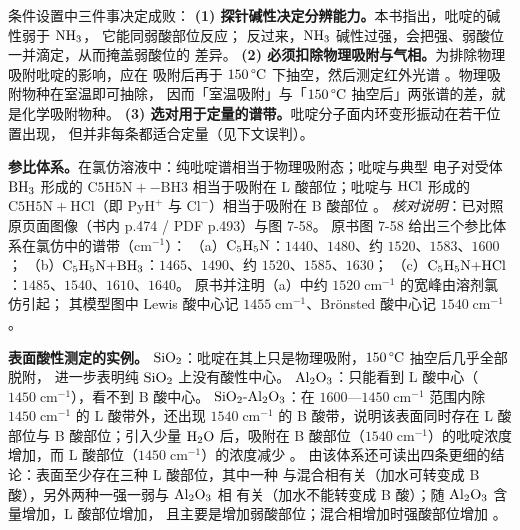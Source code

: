 \begin{measure}
条件设置中三件事决定成败：
\textbf{(1) 探针碱性决定分辨能力。}本书指出，吡啶的碱性弱于 $\ce{NH3}$，
它能同弱酸部位反应；
反过来，$\ce{NH3}$ 碱性过强，会把强、弱酸位一并滴定，从而掩盖弱酸位的
差异。
\textbf{(2) 必须扣除物理吸附与气相。}为排除物理吸附吡啶的影响，应在
吸附后再于 $150\,\degC$ 下抽空，然后测定红外光谱
。物理吸附物种在室温即可抽除，
因而「室温吸附」与「$150\,\degC$ 抽空后」两张谱的差，就是化学吸附物种。
\textbf{(3) 选对用于定量的谱带。}吡啶分子面内环变形振动在若干位置出现，
但并非每条都适合定量（见下文误判）。
\end{measure}

\begin{obs}
\textbf{参比体系。}在氯仿溶液中：纯吡啶谱相当于物理吸附态；吡啶与典型
电子对受体 $\ce{BH3}$ 形成的 $\mathrm{C5H5N{+}{-}BH3}$ 相当于吸附在
L 酸部位；吡啶与 $\ce{HCl}$ 形成的 $\mathrm{C5H5N{+}HCl}$（即
$\mathrm{PyH^{+}}$ 与 $\mathrm{Cl^{-}}$）相当于吸附在 B 酸部位
。
\emph{核对说明}：已对照原页面图像（书内 p.474 / PDF p.493）与图 7-58。
原书图 7-58 给出三个参比体系在氯仿中的谱带（$\mathrm{cm^{-1}}$）：
（a）$\ce{C5H5N}$：$1440$、$1480$、约 $1520$、$1583$、$1600$；
（b）$\ce{C5H5N{+}BH3}$：$1465$、$1490$、约 $1520$、$1585$、$1630$；
（c）$\ce{C5H5N{+}HCl}$：$1485$、$1540$、$1610$、$1640$。
原书并注明（a）中约 $1520\;\mathrm{cm^{-1}}$ 的宽峰由溶剂氯仿引起；
其模型图中 Lewis 酸中心记 $1455\;\mathrm{cm^{-1}}$、Brönsted 酸中心记
$1540\;\mathrm{cm^{-1}}$。

\textbf{表面酸性测定的实例。}
$\ce{SiO2}$：吡啶在其上只是物理吸附，$150\,\degC$ 抽空后几乎全部脱附，
进一步表明纯 $\ce{SiO2}$ 上没有酸性中心。
$\ce{Al2O3}$：只能看到 L 酸中心（$1450\;\mathrm{cm^{-1}}$），看不到
B 酸中心。
$\ce{SiO2{-}Al2O3}$：在 $1600$—$1450\;\mathrm{cm^{-1}}$ 范围内除
$1450\;\mathrm{cm^{-1}}$ 的 L 酸带外，还出现 $1540\;\mathrm{cm^{-1}}$
的 B 酸带，说明该表面同时存在 L 酸部位与 B 酸部位；引入少量
$\ce{H2O}$ 后，吸附在 B 酸部位（$1540\;\mathrm{cm^{-1}}$）的吡啶浓度
增加，而 L 酸部位（$1450\;\mathrm{cm^{-1}}$）的浓度减少
。
由该体系还可读出四条更细的结论：表面至少存在三种 L 酸部位，其中一种
与混合相有关（加水可转变成 B 酸），另外两种一强一弱与 $\ce{Al2O3}$ 相
有关（加水不能转变成 B 酸）；随 $\ce{Al2O3}$ 含量增加，L 酸部位增加，
且主要是增加弱酸部位；混合相增加时强酸部位增加
。
\end{obs}

